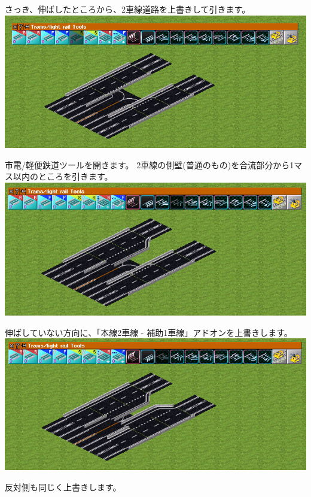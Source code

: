 \documentclass{jbook}
\begin{document}
  さっき、伸ばしたところから、2車線道路を上書きして引きます。
  \\

  \includegraphics[width = 135mm]{picture/20210214-road-1-4.png}

  市電/軽便鉄道ツールを開きます。
  2車線の側壁(普通のもの)を合流部分から1マス以内のところを引きます。
  \\

  \includegraphics[width = 135mm]{picture/20210214-road-1-5.png}

  伸ばしていない方向に、「本線2車線 - 補助1車線」アドオンを上書きします。
  \\

  \includegraphics[width = 135mm]{picture/20210214-road-1-6.png}

  反対側も同じく上書きします。
  \\
\end{document}
